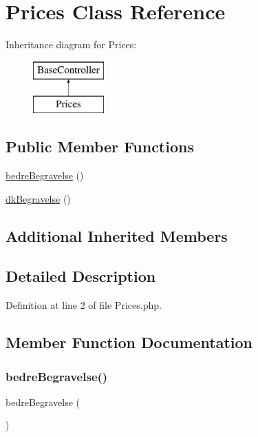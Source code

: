 \hypertarget{class_prices}{}\section{Prices Class Reference}
\label{class_prices}
Inheritance diagram for Prices\+:\begin{figure}[H]
\begin{center}
\leavevmode
\includegraphics[height=2.000000cm]{class_prices}
\end{center}
\end{figure}
\subsection*{Public Member Functions}
\begin{DoxyCompactItemize}
\item 
\hyperlink{class_prices_a9402a548a82be434da883ddf83e2162c}{bedre\+Begravelse} ()
\item 
\hyperlink{class_prices_a9b339ac1afc9f2234083aafe76d94a8e}{dk\+Begravelse} ()
\end{DoxyCompactItemize}
\subsection*{Additional Inherited Members}


\subsection{Detailed Description}


Definition at line 2 of file Prices.\+php.



\subsection{Member Function Documentation}
\hypertarget{class_prices_a9402a548a82be434da883ddf83e2162c}{}\label{class_prices_a9402a548a82be434da883ddf83e2162c} 
\subsubsection{\texorpdfstring{bedre\+Begravelse()}{bedreBegravelse()}}
{\footnotesize\ttfamily bedre\+Begravelse (\begin{DoxyParamCaption}{ }\end{DoxyParamCaption})}



